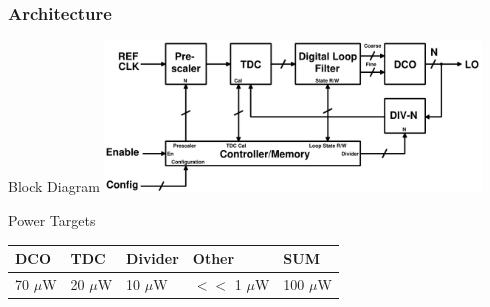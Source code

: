 \documentclass[t, screen, aspectratio=43]{beamer}
\begin{document}
\begin{frame}
	\frametitle{Architecture}
	\begin{block}{Block Diagram}
		\center\includegraphics[width=0.75\textwidth, angle=0]{pll2.pdf}

		\end{block}
		\begin{block}{Power Targets}
		\begin{table}[htb!]
			\tiny
			\centering
			\def\arraystretch{1.5}		
			\setlength\arrayrulewidth{0.75pt}
			\setlength{\tabcolsep}{1em} %
			\begin{tabular}{|l|l|l|l|l|}
				\hline 
				\rule[-1ex]{0pt}{2.5ex} \cellcolor{gray!40}\textbf{DCO} & \cellcolor{gray!40}\textbf{TDC} & \cellcolor{gray!40}\textbf{Divider }& \cellcolor{gray!40}\textbf{Other} & \cellcolor{gray!40}\textbf{SUM} \\ 
				\hline 
				\rule[-1ex]{0pt}{2.5ex} 70 $\mu$W& 20 $\mu$W & 10 $\mu$W & $<<$ 1 $\mu$W & 100 $\mu$W\\ 
				\hline 
			\end{tabular} 
		\end{table}   
	\end{block}

\end{frame}

\end{document}
